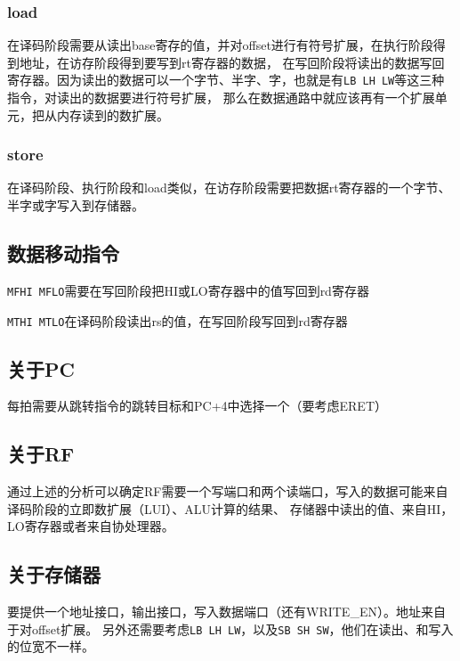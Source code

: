 \documentclass[UTF8]{ctexart}
\begin{document}
\subsubsection{load}

在译码阶段需要从读出base寄存的值，并对offset进行有符号扩展，在执行阶段得到地址，在访存阶段得到要写到rt寄存器的数据，
在写回阶段将读出的数据写回寄存器。因为读出的数据可以一个字节、半字、字，也就是有\texttt{LB LH LW}等这三种指令，对读出的数据要进行符号扩展，
那么在数据通路中就应该再有一个扩展单元，把从内存读到的数扩展。

\subsubsection{store}

在译码阶段、执行阶段和load类似，在访存阶段需要把数据rt寄存器的一个字节、半字或字写入到存储器。

\subsection{数据移动指令}

\texttt{MFHI MFLO}需要在写回阶段把HI或LO寄存器中的值写回到rd寄存器

\texttt{MTHI MTLO}在译码阶段读出rs的值，在写回阶段写回到rd寄存器

\subsection{关于PC}

每拍需要从跳转指令的跳转目标和PC+4中选择一个（要考虑ERET）

\subsection{关于RF}

通过上述的分析可以确定RF需要一个写端口和两个读端口，写入的数据可能来自译码阶段的立即数扩展（LUI）、ALU计算的结果、
存储器中读出的值、来自HI，LO寄存器或者来自协处理器。

\subsection{关于存储器}

要提供一个地址接口，输出接口，写入数据端口（还有WRITE\_EN）。地址来自于对offset扩展。
另外还需要考虑\texttt{LB LH LW}，以及\texttt{SB SH SW}，他们在读出、和写入的位宽不一样。
\end{document}
